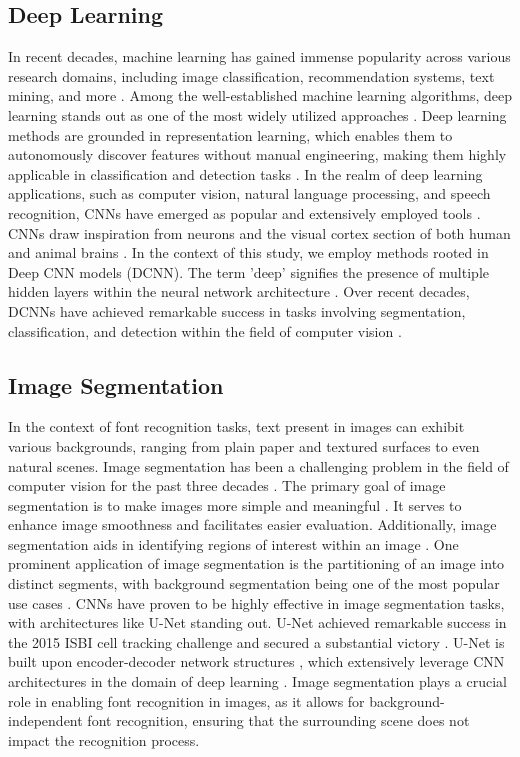 \documentclass[conference]{IEEEtran}
\begin{document}
\subsection{Deep Learning}
In recent decades, machine learning has gained immense popularity across various research domains, including image classification, recommendation systems, text mining, and more \cite{36}. Among the well-established machine learning algorithms, deep learning stands out as one of the most widely utilized approaches \cite{36}.
Deep learning methods are grounded in representation learning, which enables them to autonomously discover features without manual engineering, making them highly applicable in classification and detection tasks \cite{28}.
In the realm of deep learning applications, such as computer vision, natural language processing, and speech recognition, CNNs have emerged as popular and extensively employed tools \cite{36}. CNNs draw inspiration from neurons and the visual cortex section of both human and animal brains \cite{36}.
In the context of this study, we employ methods rooted in Deep CNN models (DCNN). The term 'deep' signifies the presence of multiple hidden layers within the neural network architecture \cite{36}. Over recent decades, DCNNs have achieved remarkable success in tasks involving segmentation, classification, and detection within the field of computer vision \cite{28}.

\subsection{Image Segmentation}
In the context of font recognition tasks, text present in images can exhibit various backgrounds, ranging from plain paper and textured surfaces to even natural scenes.
Image segmentation has been a challenging problem in the field of computer vision for the past three decades \cite{36}. The primary goal of image segmentation is to make images more simple and meaningful \cite{38}. It serves to enhance image smoothness and facilitates easier evaluation. Additionally, image segmentation aids in identifying regions of interest within an image \cite{38}.
One prominent application of image segmentation is the partitioning of an image into distinct segments, with background segmentation being one of the most popular use cases \cite{33}.
CNNs have proven to be highly effective in image segmentation tasks, with architectures like U-Net standing out. U-Net achieved remarkable success in the 2015 ISBI cell tracking challenge and secured a substantial victory \cite{15}. U-Net is built upon encoder-decoder network structures \cite{33}, which extensively leverage CNN architectures in the domain of deep learning \cite{37}.
Image segmentation plays a crucial role in enabling font recognition in images, as it allows for background-independent font recognition, ensuring that the surrounding scene does not impact the recognition process.
\end{document}
